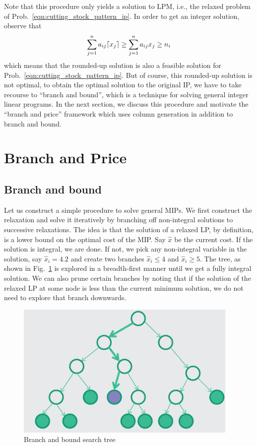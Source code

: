 \documentclass[letterpaper, 10pt, twocolumn, reqno]{amsart}
\begin{document}
Note that this procedure only yields a solution to LPM, i.e., the relaxed problem of Prob.~\eqref{eqn:cutting_stock_pattern_ip}. In order to get an integer solution, observe that
$$
\sum_{j=1}^n a_{ij} \lceil x_j\rceil \geq \sum_{j=1}^n a_{ij} x_j \geq n_i
$$
which means that the rounded-up solution is also a feasible solution for Prob.~\eqref{eqn:cutting_stock_pattern_ip}. But of course, this rounded-up solution is not optimal, to obtain the optimal solution to the original IP, we have to take recourse to ``branch and bound'', which is a technique for solving general integer linear programs. In the next section, we discuss this procedure and motivate the ``branch and price'' framework which uses column generation in addition to branch and bound.

\section{Branch and Price}
\label{sec:branch_and_price}

\subsection{Branch and bound}
\label{ssec:branch_and_bound}

Let us construct a simple procedure to solve general MIPs. We first construct the relaxation and solve it iteratively by branching off non-integral solutions to successive relaxations. The idea is that the solution of a relaxed LP, by definition, is a lower bound on the optimal cost of the MIP. Say $\hat{x}$ be the current cost. If the solution is integral, we are done. If not, we pick any non-integral variable in the solution, say $\hat{x}_i = 4.2$ and create two branches $\hat{x}_i \leq 4$ and $\hat{x}_i \geq 5$. The tree, as shown in Fig.~\ref{fig:bnb} is explored in a breadth-first manner until we get a fully integral solution. We can also prune certain branches by noting that if the solution of the relaxed LP at some node is less than the current minimum solution, we do not need to explore that branch downwards.
\begin{figure}
\centering
\includegraphics[width=0.8 \columnwidth]{bnb}
\caption{Branch and bound search tree}
\label{fig:bnb}
\end{figure}
\end{document}
